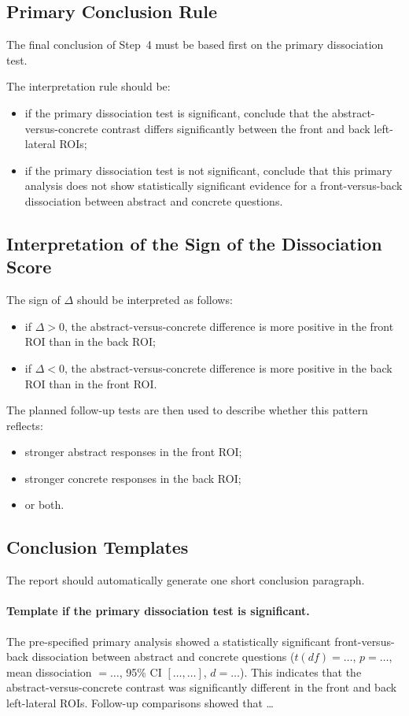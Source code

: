 \documentclass[11pt]{article}
\begin{document}
\subsection{Primary Conclusion Rule}
The final conclusion of Step~4 must be based first on the primary dissociation test.

The interpretation rule should be:
\begin{itemize}
    \item if the primary dissociation test is significant, conclude that the abstract-versus-concrete
    contrast differs significantly between the front and back left-lateral ROIs;
    \item if the primary dissociation test is not significant, conclude that this primary analysis does
    not show statistically significant evidence for a front-versus-back dissociation between abstract
    and concrete questions.
\end{itemize}

\subsection{Interpretation of the Sign of the Dissociation Score}
The sign of \(\Delta\) should be interpreted as follows:
\begin{itemize}
    \item if \(\Delta > 0\), the abstract-versus-concrete difference is more positive in the front ROI
    than in the back ROI;
    \item if \(\Delta < 0\), the abstract-versus-concrete difference is more positive in the back ROI
    than in the front ROI.
\end{itemize}

The planned follow-up tests are then used to describe whether this pattern reflects:
\begin{itemize}
    \item stronger abstract responses in the front ROI;
    \item stronger concrete responses in the back ROI;
    \item or both.
\end{itemize}

\subsection{Conclusion Templates}
The report should automatically generate one short conclusion paragraph.

\paragraph{Template if the primary dissociation test is significant.}
The pre-specified primary analysis showed a statistically significant front-versus-back dissociation
between abstract and concrete questions
(\(t(df)=\ldots\), \(p=\ldots\), mean dissociation \(=\ldots\), 95\% CI \([\ldots,\ldots]\), \(d=\ldots\)).
This indicates that the abstract-versus-concrete contrast was significantly different in the front and
back left-lateral ROIs.
Follow-up comparisons showed that \ldots
\end{document}

